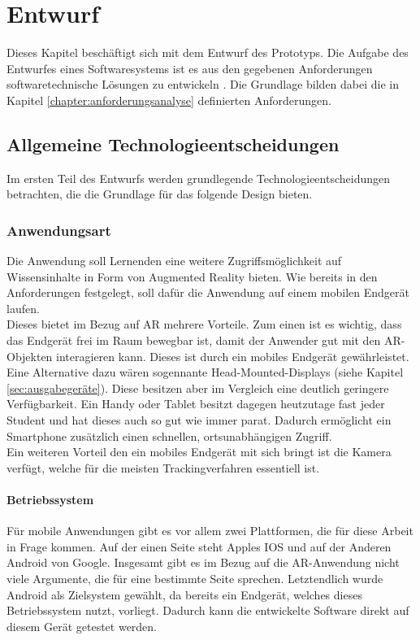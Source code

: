 \chapter{Entwurf}\label{chapter:entwurf}
Dieses Kapitel beschäftigt sich mit dem Entwurf des Prototyps. Die Aufgabe des Entwurfes eines Softwaresystems ist es aus den gegebenen Anforderungen softwaretechnische Lösungen zu entwickeln \citep{balzert:softwaretechnik}. Die Grundlage bilden dabei die in Kapitel \ref{chapter:anforderungsanalyse} definierten Anforderungen.

\section{Allgemeine Technologieentscheidungen}
Im ersten Teil des Entwurfs werden grundlegende Technologieentscheidungen betrachten, die die Grundlage für das folgende Design bieten.

\subsection{Anwendungsart}
Die Anwendung soll Lernenden eine weitere Zugriffsmöglichkeit auf Wissensinhalte in Form von Augmented Reality bieten.
Wie bereits in den Anforderungen festgelegt, soll dafür die Anwendung auf einem mobilen Endgerät laufen.\\
Dieses bietet im Bezug auf AR mehrere Vorteile. Zum einen ist es wichtig, dass das Endgerät frei im Raum bewegbar ist, damit der Anwender gut mit den AR-Objekten interagieren kann. Dieses ist durch ein mobiles Endgerät gewährleistet. Eine Alternative dazu wären sogennante Head-Mounted-Displays (siehe Kapitel \ref{sec:ausgabegeräte}). Diese besitzen aber im Vergleich eine deutlich geringere Verfügbarkeit. Ein Handy oder Tablet besitzt dagegen heutzutage fast jeder Student und hat dieses auch so gut wie immer parat. Dadurch ermöglicht ein Smartphone zusätzlich einen schnellen, ortsunabhängigen Zugriff. \\
Ein weiteren Vorteil den ein mobiles Endgerät mit sich bringt ist die Kamera verfügt, welche für die meisten Trackingverfahren essentiell ist. \\

\subsubsection{Betriebssystem}
Für mobile Anwendungen gibt es vor allem zwei Plattformen, die für diese Arbeit in Frage kommen. Auf der einen Seite steht Apples IOS und auf der Anderen Android von Google. Insgesamt gibt es im Bezug auf die AR-Anwendung nicht viele Argumente, die für eine bestimmte Seite sprechen. Letztendlich wurde Android als Zielsystem gewählt, da bereits ein Endgerät, welches dieses Betriebssystem nutzt, vorliegt. Dadurch kann die entwickelte Software direkt auf diesem Gerät getestet werden. 

